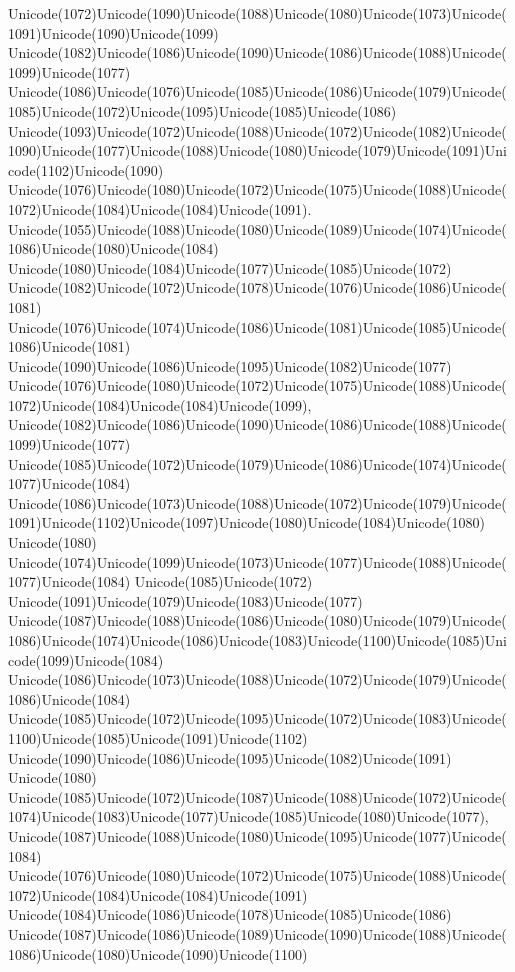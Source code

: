 \documentclass[a4paper,11pt]{report}
\begin{document}
{{Unicode(1072)Unicode(1090)Unicode(1088)Unicode(1080)Unicode(1073)Unicode(1091)Unicode(1090)Unicode(1099)
Unicode(1082)Unicode(1086)Unicode(1090)Unicode(1086)Unicode(1088)Unicode(1099)Unicode(1077)
Unicode(1086)Unicode(1076)Unicode(1085)Unicode(1086)Unicode(1079)Unicode(1085)Unicode(1072)Unicode(1095)Unicode(1085)Unicode(1086)
Unicode(1093)Unicode(1072)Unicode(1088)Unicode(1072)Unicode(1082)Unicode(1090)Unicode(1077)Unicode(1088)Unicode(1080)Unicode(1079)Unicode(1091)Unicode(1102)Unicode(1090)
Unicode(1076)Unicode(1080)Unicode(1072)Unicode(1075)Unicode(1088)Unicode(1072)Unicode(1084)Unicode(1084)Unicode(1091).
Unicode(1055)Unicode(1088)Unicode(1080)Unicode(1089)Unicode(1074)Unicode(1086)Unicode(1080)Unicode(1084)
Unicode(1080)Unicode(1084)Unicode(1077)Unicode(1085)Unicode(1072)
Unicode(1082)Unicode(1072)Unicode(1078)Unicode(1076)Unicode(1086)Unicode(1081)
Unicode(1076)Unicode(1074)Unicode(1086)Unicode(1081)Unicode(1085)Unicode(1086)Unicode(1081)
Unicode(1090)Unicode(1086)Unicode(1095)Unicode(1082)Unicode(1077)
Unicode(1076)Unicode(1080)Unicode(1072)Unicode(1075)Unicode(1088)Unicode(1072)Unicode(1084)Unicode(1084)Unicode(1099),
Unicode(1082)Unicode(1086)Unicode(1090)Unicode(1086)Unicode(1088)Unicode(1099)Unicode(1077)
Unicode(1085)Unicode(1072)Unicode(1079)Unicode(1086)Unicode(1074)Unicode(1077)Unicode(1084)
Unicode(1086)Unicode(1073)Unicode(1088)Unicode(1072)Unicode(1079)Unicode(1091)Unicode(1102)Unicode(1097)Unicode(1080)Unicode(1084)Unicode(1080)
Unicode(1080)
Unicode(1074)Unicode(1099)Unicode(1073)Unicode(1077)Unicode(1088)Unicode(1077)Unicode(1084)
Unicode(1085)Unicode(1072)
Unicode(1091)Unicode(1079)Unicode(1083)Unicode(1077)
Unicode(1087)Unicode(1088)Unicode(1086)Unicode(1080)Unicode(1079)Unicode(1086)Unicode(1074)Unicode(1086)Unicode(1083)Unicode(1100)Unicode(1085)Unicode(1099)Unicode(1084)
Unicode(1086)Unicode(1073)Unicode(1088)Unicode(1072)Unicode(1079)Unicode(1086)Unicode(1084)
Unicode(1085)Unicode(1072)Unicode(1095)Unicode(1072)Unicode(1083)Unicode(1100)Unicode(1085)Unicode(1091)Unicode(1102)
Unicode(1090)Unicode(1086)Unicode(1095)Unicode(1082)Unicode(1091)
Unicode(1080)
Unicode(1085)Unicode(1072)Unicode(1087)Unicode(1088)Unicode(1072)Unicode(1074)Unicode(1083)Unicode(1077)Unicode(1085)Unicode(1080)Unicode(1077),
Unicode(1087)Unicode(1088)Unicode(1080)Unicode(1095)Unicode(1077)Unicode(1084)
Unicode(1076)Unicode(1080)Unicode(1072)Unicode(1075)Unicode(1088)Unicode(1072)Unicode(1084)Unicode(1084)Unicode(1091)
Unicode(1084)Unicode(1086)Unicode(1078)Unicode(1085)Unicode(1086)
Unicode(1087)Unicode(1086)Unicode(1089)Unicode(1090)Unicode(1088)Unicode(1086)Unicode(1080)Unicode(1090)Unicode(1100)
}}
\end{document}
